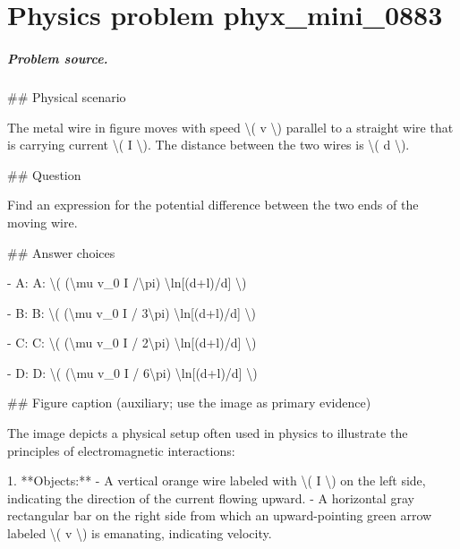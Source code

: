 
\chapter{Physics problem phyx\_mini\_0883}
\label{ch:PhyXMiniProblems_problem_phyx_mini_0883}

\paragraph{Problem source.}
\#\# Physical scenario

The metal wire in figure moves with speed \textbackslash{}( v \textbackslash{}) parallel to a straight wire that is carrying current \textbackslash{}( I \textbackslash{}). The distance between the two wires is \textbackslash{}( d \textbackslash{}).

\#\# Question

Find an expression for the potential difference between the two ends of the moving wire.

\#\# Answer choices

- A: A: \textbackslash{}( (\textbackslash{}mu v\_0 I /\textbackslash{}pi) \textbackslash{}ln[(d+l)/d] \textbackslash{})

- B: B: \textbackslash{}( (\textbackslash{}mu v\_0 I / 3\textbackslash{}pi) \textbackslash{}ln[(d+l)/d] \textbackslash{})

- C: C: \textbackslash{}( (\textbackslash{}mu v\_0 I / 2\textbackslash{}pi) \textbackslash{}ln[(d+l)/d] \textbackslash{})

- D: D: \textbackslash{}( (\textbackslash{}mu v\_0 I / 6\textbackslash{}pi) \textbackslash{}ln[(d+l)/d] \textbackslash{})

\#\# Figure caption (auxiliary; use the image as primary evidence)

The image depicts a physical setup often used in physics to illustrate the principles of electromagnetic interactions:

1. **Objects:**
   - A vertical orange wire labeled with \textbackslash{}( I \textbackslash{}) on the left side, indicating the direction of the current flowing upward.
   - A horizontal gray rectangular bar on the right side from which an upward-pointing green arrow labeled \textbackslash{}( v \textbackslash{}) is emanating, indicating velocity.
   
